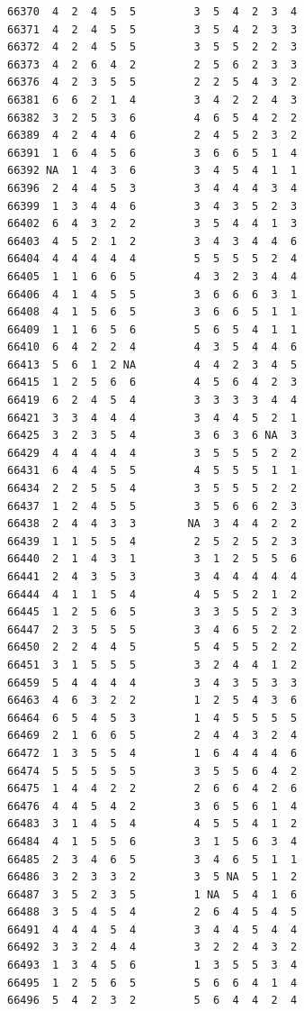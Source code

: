\documentclass[
  letterpaper,
  DIV=11,
  numbers=noendperiod]{scrreprt}
\begin{document}
\begin{verbatim}
66370  4  2  4  5  5         3  5  4  2  3  4
66371  4  2  4  5  5         3  5  4  2  3  3
66372  4  2  4  5  5         3  5  5  2  2  3
66373  4  2  6  4  2         2  5  6  2  3  3
66376  4  2  3  5  5         2  2  5  4  3  2
66381  6  6  2  1  4         3  4  2  2  4  3
66382  3  2  5  3  6         4  6  5  4  2  2
66389  4  2  4  4  6         2  4  5  2  3  2
66391  1  6  4  5  6         3  6  6  5  1  4
66392 NA  1  4  3  6         3  4  5  4  1  1
66396  2  4  4  5  3         3  4  4  4  3  4
66399  1  3  4  4  6         3  4  3  5  2  3
66402  6  4  3  2  2         3  5  4  4  1  3
66403  4  5  2  1  2         3  4  3  4  4  6
66404  4  4  4  4  4         5  5  5  5  2  4
66405  1  1  6  6  5         4  3  2  3  4  4
66406  4  1  4  5  5         3  6  6  6  3  1
66408  4  1  5  6  5         3  6  6  5  1  1
66409  1  1  6  5  6         5  6  5  4  1  1
66410  6  4  2  2  4         4  3  5  4  4  6
66413  5  6  1  2 NA         4  4  2  3  4  5
66415  1  2  5  6  6         4  5  6  4  2  3
66419  6  2  4  5  4         3  3  3  3  4  4
66421  3  3  4  4  4         3  4  4  5  2  1
66425  3  2  3  5  4         3  6  3  6 NA  3
66429  4  4  4  4  4         3  5  5  5  2  2
66431  6  4  4  5  5         4  5  5  5  1  1
66434  2  2  5  5  4         3  5  5  5  2  2
66437  1  2  4  5  5         3  5  6  6  2  3
66438  2  4  4  3  3        NA  3  4  4  2  2
66439  1  1  5  5  4         2  5  2  5  2  3
66440  2  1  4  3  1         3  1  2  5  5  6
66441  2  4  3  5  3         3  4  4  4  4  4
66444  4  1  1  5  4         4  5  5  2  1  2
66445  1  2  5  6  5         3  3  5  5  2  3
66447  2  3  5  5  5         3  4  6  5  2  2
66450  2  2  4  4  5         5  4  5  5  2  2
66451  3  1  5  5  5         3  2  4  4  1  2
66459  5  4  4  4  4         3  4  3  5  3  3
66463  4  6  3  2  2         1  2  5  4  3  6
66464  6  5  4  5  3         1  4  5  5  5  5
66469  2  1  6  6  5         2  4  4  3  2  4
66472  1  3  5  5  4         1  6  4  4  4  6
66474  5  5  5  5  5         3  5  5  6  4  2
66475  1  4  4  2  2         2  6  6  4  2  6
66476  4  4  5  4  2         3  6  5  6  1  4
66483  3  1  4  5  4         4  5  5  4  1  2
66484  4  1  5  5  6         3  1  5  6  3  4
66485  2  3  4  6  5         3  4  6  5  1  1
66486  3  2  3  3  2         3  5 NA  5  1  2
66487  3  5  2  3  5         1 NA  5  4  1  6
66488  3  5  4  5  4         2  6  4  5  4  5
66491  4  4  4  5  4         3  4  4  5  4  4
66492  3  3  2  4  4         3  2  2  4  3  2
66493  1  3  4  5  6         1  3  5  5  3  4
66495  1  2  5  6  5         5  6  6  4  1  4
66496  5  4  2  3  2         5  6  4  4  2  4

\end{verbatim}
\end{document}

